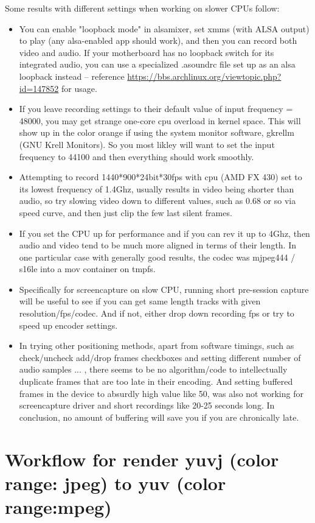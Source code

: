 Some results with different settings when working on slower CPUs follow:
\begin{itemize}
\item You can enable "loopback mode" in alsamixer, set xmms (with ALSA output) to play
(any alsa-enabled app should work), and then you can record both video and audio. If
your motherboard has no loopback switch for its integrated audio, you can use a
specialized .asoundrc file set up as an alsa loopback instead -- reference 
{\small \url{https://bbs.archlinux.org/viewtopic.php?id=147852}} for usage.
\item If you leave recording settings to their default value of input frequency = 48000, you
may get strange one-core cpu overload in kernel space. This will show up in the color
orange if using the system monitor software, gkrellm (GNU Krell Monitors). So you most
likley will want to set the input frequency to 44100 and then everything should work
smoothly.
\item Attempting to record 1440*900*24bit*30fps with cpu (AMD FX 430) set to its lowest
frequency of 1.4Ghz, usually results in video being shorter than audio, so try slowing
video down to different values, such as 0.68 or so via speed curve, and then just clip
the few last silent frames.
\item If you set the CPU up for performance and if you can rev it up to 4Ghz, then audio and
video tend to be much more aligned in terms of their length.  In one particular case with
generally good results, the codec was mjpeg444 / s16le into a mov container on tmpfs.
\item Specifically for screencapture on slow CPU, running short pre-session capture will be
useful to see if you can get same length tracks with given resolution/fps/codec. And if
not, either drop down recording fps or try to speed up encoder settings.
\item In trying other positioning methods, apart from software timings, such as check/uncheck
add/drop frames checkboxes and setting different number of audio samples ... , there seems
to be no algorithm/code to intellectually duplicate frames that are too late in their
encoding. And setting buffered frames in the device to absurdly high value like 50, was 
also not working for screencapture driver and short recordings like 20-25 seconds long.
In conclusion, no amount of buffering will save you if you are chronically late.
\end{itemize}

\section{Workflow for render yuvj (color range: jpeg) to yuv (color range:mpeg)}%
\label{sec: yuvj_to_yuv}

